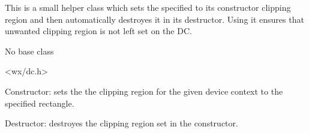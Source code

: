 This is a small helper class which sets the specified to its constructor
clipping region and then automatically destroyes it in its destructor. Using
it ensures that unwanted clipping region is not left set on the DC.


No base class


<wx/dc.h>







Constructor: sets the the clipping region for the given device context to the
specified rectangle.



Destructor: destroyes the clipping region set in the constructor.

